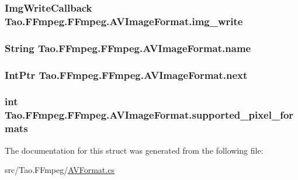 \label{struct_tao_1_1_f_fmpeg_1_1_f_fmpeg_1_1_a_v_image_format_a894e93c491833f8bb2f96c8233c79f70}
\hypertarget{struct_tao_1_1_f_fmpeg_1_1_f_fmpeg_1_1_a_v_image_format_a8ce9ae50bdd6e2440b134c6c59212cb7}{
\subsubsection[{img\_\-write}]{\setlength{\rightskip}{0pt plus 5cm}ImgWriteCallback {\bf Tao.FFmpeg.FFmpeg.AVImageFormat.img\_\-write}}}
\label{struct_tao_1_1_f_fmpeg_1_1_f_fmpeg_1_1_a_v_image_format_a8ce9ae50bdd6e2440b134c6c59212cb7}
\hypertarget{struct_tao_1_1_f_fmpeg_1_1_f_fmpeg_1_1_a_v_image_format_a64df8b0c1cee507a37d17271cf7ad60e}{
\subsubsection[{name}]{\setlength{\rightskip}{0pt plus 5cm}String {\bf Tao.FFmpeg.FFmpeg.AVImageFormat.name}}}
\label{struct_tao_1_1_f_fmpeg_1_1_f_fmpeg_1_1_a_v_image_format_a64df8b0c1cee507a37d17271cf7ad60e}
\hypertarget{struct_tao_1_1_f_fmpeg_1_1_f_fmpeg_1_1_a_v_image_format_a23dc0c4c25d4246305216cf322ed31c5}{
\subsubsection[{next}]{\setlength{\rightskip}{0pt plus 5cm}IntPtr {\bf Tao.FFmpeg.FFmpeg.AVImageFormat.next}}}
\label{struct_tao_1_1_f_fmpeg_1_1_f_fmpeg_1_1_a_v_image_format_a23dc0c4c25d4246305216cf322ed31c5}
\hypertarget{struct_tao_1_1_f_fmpeg_1_1_f_fmpeg_1_1_a_v_image_format_ade2a15b4f8d8d96ba35fa19595aea1fc}{
\subsubsection[{supported\_\-pixel\_\-formats}]{\setlength{\rightskip}{0pt plus 5cm}int {\bf Tao.FFmpeg.FFmpeg.AVImageFormat.supported\_\-pixel\_\-formats}}}
\label{struct_tao_1_1_f_fmpeg_1_1_f_fmpeg_1_1_a_v_image_format_ade2a15b4f8d8d96ba35fa19595aea1fc}


The documentation for this struct was generated from the following file:\begin{DoxyCompactItemize}
\item 
src/Tao.FFmpeg/\hyperlink{_a_v_format_8cs}{AVFormat.cs}\end{DoxyCompactItemize}
